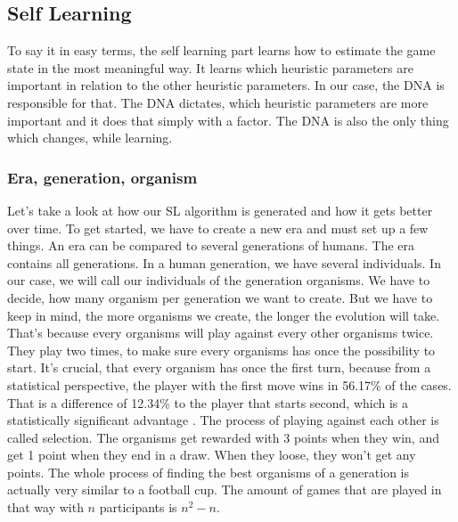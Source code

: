 \subsection{Self Learning} \label{selflearning}
To say it in easy terms, the self learning part learns how to estimate the game state in the most meaningful way. It learns which heuristic parameters are important in relation to the other heuristic parameters. In our case, the \ac{DNA}  is responsible for that. The \ac{DNA} dictates, which heuristic parameters are more important and it does that simply with a factor. The \ac{DNA} is also the only thing which changes, while learning.

\subsubsection{Era, generation, organism}
Let's take a look at how our \ac{SL} algorithm is generated and how it gets better over time.
To get started, we have to create a new \ac{era} and must set up a few things. An era can be compared to several \acp{generation} of humans. 
The era contains all generations. In a human generation, we have several individuals. In our case, we will call our individuals of the generation \acp{organism}. We have to decide, how many organism per generation we want to create. But we have to keep in mind, the more organisms we create, the longer the evolution will take. That's because every organisms will play against every other organisms twice. They play two times, to make sure every organisms has once the possibility to start. It's crucial, that every organism has once the first turn, because from a statistical perspective, the player with the first move wins in 56.17\% of the cases. That is a difference of 12.34\% to the player that starts second, which is a statistically significant advantage \cite{web:tsurel2013}.
The process of playing against each other is called selection. The organisms get rewarded with 3 points when they win, and get 1 point when they end in a draw. When they loose, they won't get any points. The whole process of finding the best organisms of a generation is actually very similar to a football cup.
The amount of games that are played in that way with $n$ participants is $n^2-n$.\\

